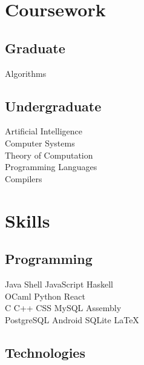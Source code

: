 \documentclass[letterpaper]{deedy-resume} %
\begin{document}
\begin{minipage}[t]{0.33\textwidth}
\section{Coursework}
\subsection{Graduate}
Algorithms
\sectionspace %

\subsection{Undergraduate}
Artificial Intelligence \\
Computer Systems \\
Theory of Computation \\
Programming Languages \\
Compilers
\sectionspace %


\section{Skills}

\subsection{Programming}

Java \textbullet{} Shell \textbullet{} JavaScript \textbullet{} Haskell \\
OCaml \textbullet{} Python \textbullet{} React  \\

C \textbullet{} C++ \textbullet{} CSS \textbullet{} MySQL \textbullet{} Assembly \\

PostgreSQL \textbullet{} Android \textbullet{} SQLite \textbullet{} \LaTeX\ \\

\sectionspace %

\subsection{Technologies}


\end{minipage}
\end{document}
